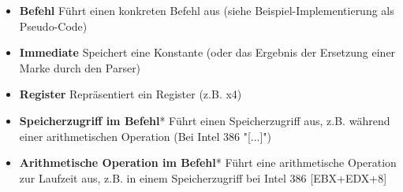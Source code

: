 \begin{itemize}
	\item \textbf{Befehl} Führt einen konkreten Befehl aus (siehe Beispiel-Implementierung als Pseudo-Code)

	\item \textbf{Immediate} Speichert eine Konstante (oder das Ergebnis der Ersetzung einer Marke durch den Parser)

	\item \textbf{Register} Repräsentiert ein Register (z.B. x4)

	\item \textbf{Speicherzugriff im Befehl}* Führt einen Speicherzugriff aus, z.B. während einer arithmetischen Operation (Bei Intel 386 "[...]")

	\item \textbf{Arithmetische Operation im Befehl}* Führt eine arithmetische Operation zur Laufzeit aus, z.B. in einem Speicherzugriff bei Intel 386 [EBX+EDX+8]

\end{itemize}

